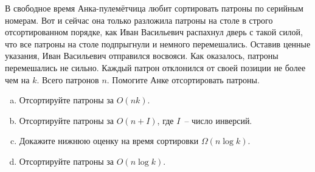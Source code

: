 
\begin{problem}
    В свободное время Анка-пулемётчица любит сортировать патроны по серийным номерам.
    Вот и сейчас она только разложила патроны на столе в строго отсортированном порядке, как Иван Васильевич распахнул дверь
    с такой силой, что все патроны на столе подпрыгнули и немного перемешались. Оставив ценные указания, Иван Васильевич отправился восвояси.
    Как оказалось, патроны перемешались не сильно. Каждый патрон отклонился от своей позиции не более чем на $k$. Всего патронов $n$.
    Помогите Анке отсортировать патроны.

    \begin{enumerate}[a)]
        \item Отсортируйте патроны за $O(nk)$.
        \item Отсортируйте патроны за $O(n + I)$, где $I$~-- число инверсий.
        \item Докажите нижнюю оценку на время сортировки $\Omega(n \log k)$.
        \item Отсортируйте патроны за $O(n \log k)$.
    \end{enumerate}
\end{problem}

